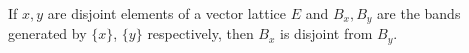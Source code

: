 If $x, y$ are disjoint elements of a vector lattice $E$ and $B_x, B_y$ are the bands generated by $\{x\}$, $\{y\}$ respectively, then $B_x$ is disjoint from $B_y$.
